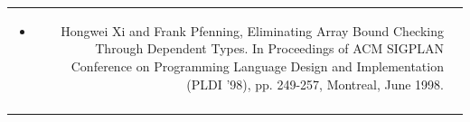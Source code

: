 \documentclass{article}
\begin{document}
\begin{tabular}{rp{\rightdim}}
{\begin{minipage}{\wholedim}
\begin{itemize}
\item Hongwei Xi and Frank Pfenning, Eliminating Array Bound Checking Through Dependent Types. In Proceedings of ACM SIGPLAN Conference on Programming Language Design and Implementation (PLDI '98), pp. 249-257, Montreal, June 1998.
\end{itemize}\end{minipage}
} \\[\smalldim]\\[\middim]


\end{tabular}
\end{document}
